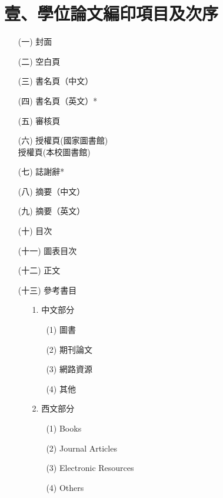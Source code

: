 \documentclass[12pt,oneside,openany,a4paper]{book}
\begin{document}
\newpage
\tableofcontents

\newpage
\listoftables
\listoffigures

\mainmatter

\chapter{壹、學位論文編印項目及次序}
    \begin{enumerate}
        \item[(一)] 封面
        \item[(二)] 空白頁
        \item[(三)] 書名頁（中文）
        \item[(四)] 書名頁（英文）*
        \item[(五)] 審核頁
        \item[(六)] 授權頁(國家圖書館)\\
                    授權頁(本校圖書館)
        \item[(七)] 誌謝辭*
        \item[(八)] 摘要（中文）
        \item[(九)] 摘要（英文）
        \item[(十)] 目次
        \item[(十一)] 圖表目次
        \item[(十二)] 正文
        \item[(十三)]  參考書目
        \begin{enumerate}
            \item[1.] 中文部分
            \begin{enumerate}
                \item[(1)] 圖書
                \item[(2)] 期刊論文
                \item[(3)] 網路資源
                \item[(4)] 其他
            \end{enumerate}
            \item[2.] 西文部分
            \begin{enumerate}
                \item[(1)] Books
                \item[(2)] Journal Articles
                \item[(3)] Electronic Resources
                \item[(4)] Others
            \end{enumerate}
        \end{enumerate}
    \end{enumerate}
\end{document}
